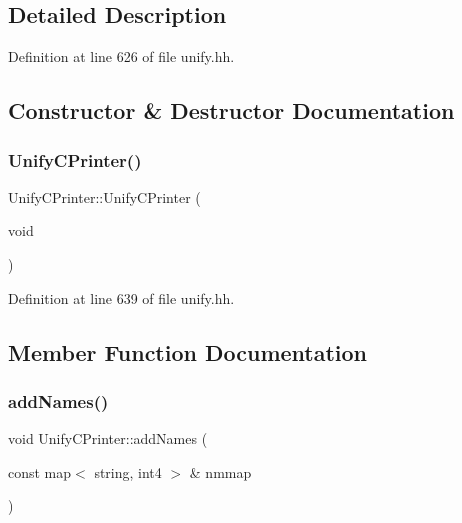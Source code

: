 \subsection{Detailed Description}


Definition at line 626 of file unify.\+hh.



\subsection{Constructor \& Destructor Documentation}
\mbox{\label{class_unify_c_printer_accbb06496e0f3a34e247b8881062ddac}} 
\subsubsection{\texorpdfstring{UnifyCPrinter()}{UnifyCPrinter()}}
{\footnotesize\ttfamily Unify\+C\+Printer\+::\+Unify\+C\+Printer (\begin{DoxyParamCaption}\item[{void}]{ }\end{DoxyParamCaption})\hspace{0.3cm}{\ttfamily [inline]}}



Definition at line 639 of file unify.\+hh.



\subsection{Member Function Documentation}
\mbox{\label{class_unify_c_printer_a15e995edbb7a6627d5cb27d873cbe700}} 
\subsubsection{\texorpdfstring{addNames()}{addNames()}}
{\footnotesize\ttfamily void Unify\+C\+Printer\+::add\+Names (\begin{DoxyParamCaption}\item[{const map$<$ string, int4 $>$ \&}]{nmmap }\end{DoxyParamCaption})}

